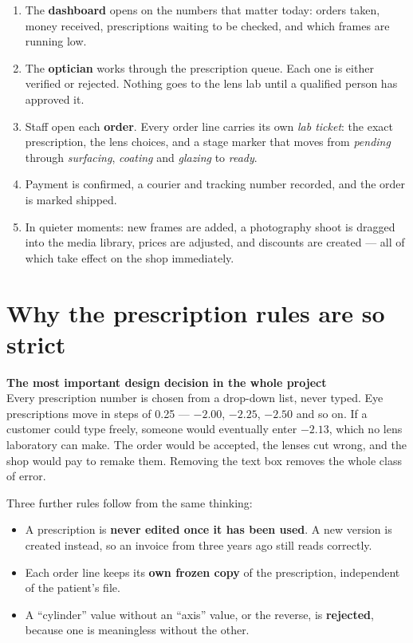\documentclass[11pt,a4paper]{report}
\newcommand{\keybox}[2]{%
  \begin{center}
  \begin{minipage}{0.94\textwidth}
  \colorbox{vclight}{\parbox{\dimexpr\textwidth-2\fboxsep}{%
    \vspace{3pt}\textbf{\color{vcblue}#1}\\[3pt]#2\vspace{4pt}}}
  \end{minipage}
  \end{center}}
\begin{document}
\begin{enumerate}
  \item The \textbf{dashboard} opens on the numbers that matter today:
        orders taken, money received, prescriptions waiting to be checked,
        and which frames are running low.

  \item The \textbf{optician} works through the prescription queue. Each one
        is either verified or rejected. Nothing goes to the lens lab until a
        qualified person has approved it.

  \item Staff open each \textbf{order}. Every order line carries its own
        \emph{lab ticket}: the exact prescription, the lens choices, and a
        stage marker that moves from \emph{pending} through \emph{surfacing},
        \emph{coating} and \emph{glazing} to \emph{ready}.

  \item Payment is confirmed, a courier and tracking number recorded, and the
        order is marked shipped.

  \item In quieter moments: new frames are added, a photography shoot is
        dragged into the media library, prices are adjusted, and discounts are
        created --- all of which take effect on the shop immediately.
\end{enumerate}

\section{Why the prescription rules are so strict}

\keybox{The most important design decision in the whole project}{Every
prescription number is chosen from a drop-down list, never typed. Eye
prescriptions move in steps of 0.25 --- $-2.00$, $-2.25$, $-2.50$ and so on.
If a customer could type freely, someone would eventually enter $-2.13$, which
no lens laboratory can make. The order would be accepted, the lenses cut wrong,
and the shop would pay to remake them. Removing the text box removes the whole
class of error.}

Three further rules follow from the same thinking:

\begin{itemize}
  \item A prescription is \textbf{never edited once it has been used}. A new
        version is created instead, so an invoice from three years ago still
        reads correctly.
  \item Each order line keeps its \textbf{own frozen copy} of the
        prescription, independent of the patient's file.
  \item A ``cylinder'' value without an ``axis'' value, or the reverse, is
        \textbf{rejected}, because one is meaningless without the other.
\end{itemize}
\end{document}
